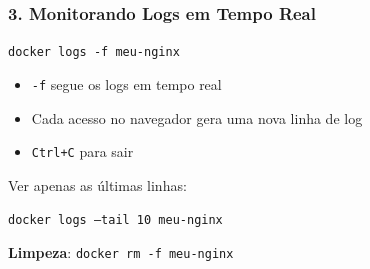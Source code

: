 \begin{frame}
  \frametitle{3. Monitorando Logs em Tempo Real}
  \texttt{docker logs -f meu-nginx}

  \vspace{0.5em}
  \begin{itemize}
    \item \texttt{-f} segue os logs em tempo real
    \item Cada acesso no navegador gera uma nova linha de log
    \item \texttt{Ctrl+C} para sair
  \end{itemize}

  \vspace{0.5em}
  Ver apenas as últimas linhas:

  \vspace{0.3em}
  \texttt{docker logs --tail 10 meu-nginx}

  \vspace{0.8em}
  \textbf{Limpeza}: \texttt{docker rm -f meu-nginx}
\end{frame}
